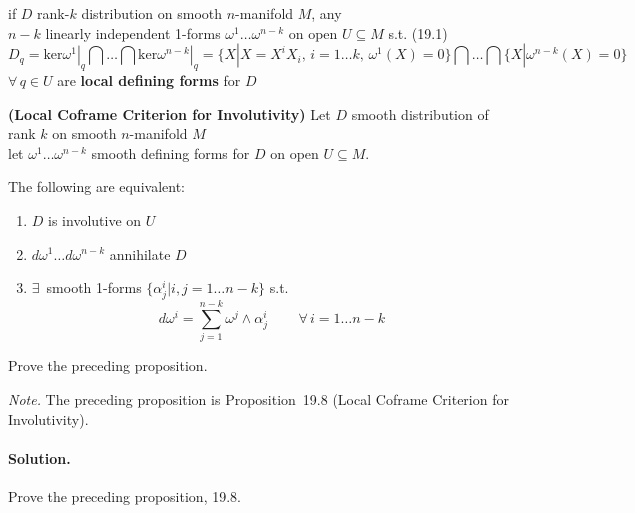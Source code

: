 if $D$ rank-$k$ distribution on smooth $n$-manifold $M$, any \\
\phantom{if $D$ } $n-k$ linearly independent 1-forms $\omega^1 \dots \omega^{n-k}$ on open $U\subseteq M$ s.t. (19.1) 
\[
D_q = \left. \text{ker}\omega^1 \right|_q \bigcap \dots \bigcap \left. \text{ker}\omega^{n-k} \right|_q = \lbrace X | X=X^iX_i, \, i =1 \dots k, \, \omega^1(X) = 0\rbrace \bigcap \dots \bigcap \lbrace X | \omega^{n-k}(X) = 0\rbrace
\]
$\forall \, q \in U$ are \textbf{local defining forms} for $D$



\begin{proposition}[19.8] \textbf{(Local Coframe Criterion for Involutivity)}
  Let $D$ smooth distribution of rank $k$ on smooth $n$-manifold $M$ \\
let $\omega^1 \dots \omega^{n-k}$ smooth defining forms for $D$ on open $U \subseteq M$. 

The following are equivalent:
\begin{enumerate}
\item[(a)] $D$ is involutive on $U$ 
\item[(b)] $d\omega^1 \dots d\omega^{n-k}$ annihilate $D$
\item[(c)] $\exists \, $ smooth 1-forms $\lbrace \alpha^i_j | i, j =1 \dots n-k \rbrace$ s.t. 
\[
d\omega^i = \sum_{j=1}^{n-k} \omega^j \wedge \alpha^i_j \quad \quad \, \forall \, i = 1 \dots n-k
\]
\end{enumerate}
\end{proposition}

\begin{exercise}
Prove the preceding proposition.
\end{exercise}
\noindent\emph{Note.} The preceding proposition is Proposition~19.8 (Local Coframe Criterion for Involutivity).
\paragraph{Solution.} Prove the preceding proposition, 19.8.  

